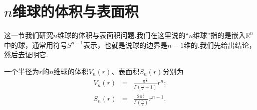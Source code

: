 \section{$n$维球的体积与表面积}\label{sec:N-sphere}
	这一节我们研究$n$维球的体积与表面积问题.我们在这里说的“$n$维球”指的是嵌入$\mathbb{R}^n$中的球，通常用符号$S^{n-1}$表示，也就是说球的边界是$n-1$维的.我们先给出结论，然后去证明它.
	\begin{theorem}
		一个半径为$r$的$n$维球的体积$V_n(r)$、表面积$S_n(r)$分别为
		\begin{eqnarray}\label{eq:V_n(r),S_n(r)}
			V_n(r)&=&\frac{\pi^{\frac{n}{2}}}{\varGamma\left(\frac{n}{2}+1\right)}r^n;\\
			S_n(r)&=&\frac{2\pi^{\frac{n}{2}}}{\varGamma\left(\frac{n}{2}\right)}r^{n-1}.
		\end{eqnarray}
	\end{theorem}
		
